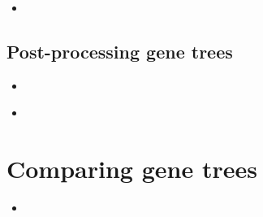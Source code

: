 \documentclass[compress, ucs, xelatex, 11pt, xcolor=x11names, aspectratio=1609,
	hyperref={
		bookmarks=true,
		unicode=true,
		colorlinks=true,
		pdftitle={HybSeq course},
		plainpages=false,
		pdfauthor={Vojtech Zeisek},
		pdfsubject={Practical processing of HybSeq target enrichment sequencing data on computing grids like MetaCentrum},
		pdfcreator={XeLaTeX},
		pdfkeywords={BASH, command line, GNU, HybSeq, Linux, MetaCentrum, sequencing shell, target enrichment},
		linkcolor=Cyan2, %
		anchorcolor=Firebrick2, %
		citecolor=Firebrick2, %
		filecolor=Firebrick2, %
		menucolor=Firebrick2, %
		urlcolor=Chartreuse2, %
		pdftex},
	url={hyphens, lowtilde} %
	]{beamer}
\begin{document}
\begin{frame}[fragile]{}
	\begin{itemize}
		\item 
	\end{itemize}
	\begin{spluscode}
    
	\end{spluscode}
	\begin{bashcode}
    
	\end{bashcode}
\end{frame}

\subsection{Post-processing gene trees}

\begin{frame}[fragile]{}
	\begin{itemize}
		\item 
	\end{itemize}
	\begin{spluscode}
    
	\end{spluscode}
	\begin{bashcode}
    
	\end{bashcode}
\end{frame}

\begin{frame}[fragile]{}
	\begin{itemize}
		\item 
	\end{itemize}
	\begin{spluscode}
    
	\end{spluscode}
	\begin{bashcode}
    
	\end{bashcode}
\end{frame}

\section{Comparing gene trees}

\begin{frame}[fragile]{}
	\begin{itemize}
		\item 
	\end{itemize}
	\begin{spluscode}
    
	\end{spluscode}
	\begin{bashcode}
    
	\end{bashcode}
\end{frame}
\end{document}
